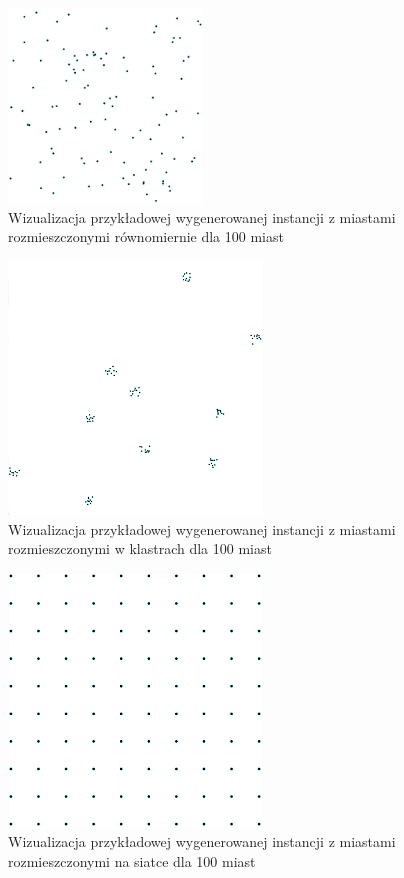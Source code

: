 \begin{figure}[h!]
    \centering
    \includegraphics[width=0.46\textwidth]{chapters/experiments/img/uniform_example.png}
    \caption{Wizualizacja przykładowej wygenerowanej instancji z miastami rozmieszczonymi równomiernie dla 100 miast}
    \label{fig:uniform_example}
\end{figure}

\newpage

\begin{figure}[h!]
    \centering
    \includegraphics[width=0.60\textwidth]{chapters/experiments/img/clique_example.png}
    \caption{Wizualizacja przykładowej wygenerowanej instancji z miastami rozmieszczonymi w klastrach dla 100 miast}
    \label{fig:clique_example}
\end{figure}

\begin{figure}[h!]
    \centering
    \includegraphics[width=0.60\textwidth]{chapters/experiments/img/grid_example.png}
    \caption{Wizualizacja przykładowej wygenerowanej instancji z miastami rozmieszczonymi na siatce dla 100 miast}
    \label{fig:grid_example}
\end{figure}

